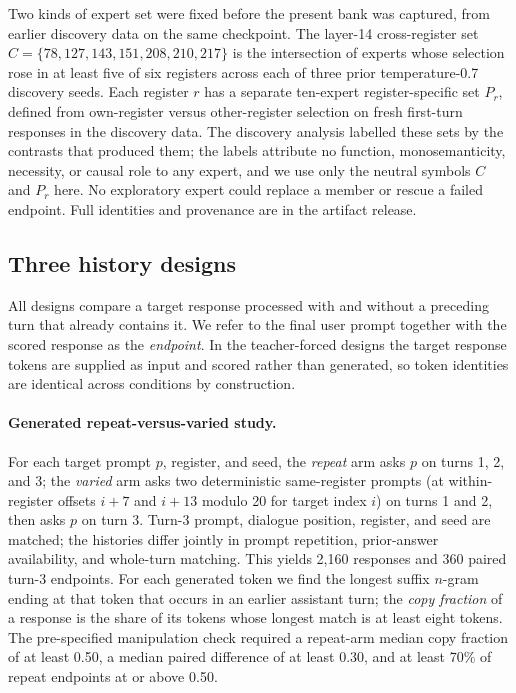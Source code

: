 \documentclass[10pt,a4paper,twocolumn]{article}
\begin{document}
Two kinds of expert set were fixed before the present bank was captured, from
earlier discovery data on the same checkpoint. The layer-14 cross-register set
\(C=\{78,127,143,151,208,210,217\}\) is the intersection of experts whose
selection rose in at least five of six registers across each of three prior
temperature-0.7 discovery seeds. Each register \(r\) has a separate ten-expert
register-specific set \(P_r\), defined from own-register versus other-register
selection on fresh first-turn responses in the discovery data. The discovery
analysis labelled these sets by the contrasts that produced them; the labels
attribute no function, monosemanticity, necessity, or causal role to any
expert, and we use only the neutral symbols \(C\) and \(P_r\) here. No
exploratory expert could replace a member or rescue a failed endpoint. Full
identities and provenance are in the artifact release.

\subsection{Three history designs}

All designs compare a target response processed with and without a preceding
turn that already contains it. We refer to the final user prompt together with
the scored response as the \emph{endpoint}. In the teacher-forced designs the
target response tokens are supplied as input and scored rather than generated,
so token identities are identical across conditions by construction.

\paragraph{Generated repeat-versus-varied study.}
For each target prompt \(p\), register, and seed, the \emph{repeat} arm asks
\(p\) on turns 1, 2, and 3; the \emph{varied} arm asks two deterministic
same-register prompts (at within-register offsets \(i+7\) and \(i+13\) modulo
20 for target index \(i\)) on turns 1 and 2, then asks \(p\) on turn 3. Turn-3
prompt, dialogue position, register, and seed are matched; the histories
differ jointly in prompt repetition, prior-answer availability, and whole-turn
matching. This yields 2,160 responses and 360 paired turn-3 endpoints. For each
generated token we find the longest suffix \(n\)-gram ending at that token
that occurs in an earlier assistant turn; the \emph{copy fraction} of a
response is the share of its tokens whose longest match is at least eight
tokens. The pre-specified manipulation check required a repeat-arm median copy
fraction of at least 0.50, a median paired difference of at least 0.30, and at
least 70\% of repeat endpoints at or above 0.50.
\end{document}
